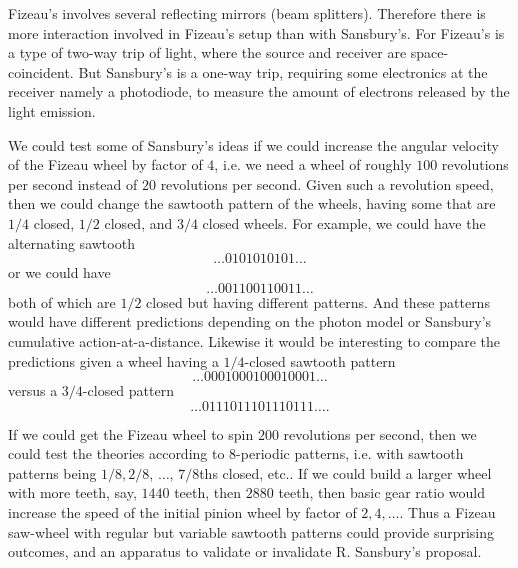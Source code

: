 \documentclass[12pt]{amsart}
\begin{document}
Fizeau's involves several reflecting mirrors (beam splitters). Therefore there is more interaction involved in Fizeau's setup than with Sansbury's. For Fizeau's is a type of two-way trip of light, where the source and receiver are space-coincident. But Sansbury's is a one-way trip, requiring some electronics at the receiver namely a photodiode, to measure the amount of electrons released by the light emission.

We could test some of Sansbury's ideas if we could increase the angular velocity of the Fizeau wheel by factor of $4$, i.e. we need a wheel of roughly $100$ revolutions per second instead of $20$ revolutions per second. Given such a revolution speed, then we could change the sawtooth pattern of the wheels, having some that are $1/4$ closed, $1/2$ closed, and $3/4$ closed wheels. For example, we could have the alternating sawtooth $$\ldots 0101010101 \ldots$$ or we could have $$\ldots 001100110011 \ldots$$ both of which are $1/2$ closed but having different patterns. And these patterns would have different predictions depending on the photon model or Sansbury's cumulative action-at-a-distance. Likewise it would be interesting to compare the predictions given a wheel having a $1/4$-closed sawtooth pattern $$\ldots 0001000100010001 \ldots$$ versus a $3/4$-closed pattern $$ \ldots 0111011101110111\ldots.$$ 

If we could get the Fizeau wheel to spin $200$ revolutions per second, then we could test the theories according to $8$-periodic patterns, i.e. with sawtooth patterns being $1/8, 2/8$, $\ldots$, $7/8$ths closed, etc.. If we could build a larger wheel with more teeth, say, $1440$ teeth, then $2880$ teeth, then basic gear ratio would increase the speed of the initial pinion wheel by factor of $2,4, \ldots$. Thus a Fizeau saw-wheel with regular but variable sawtooth patterns could provide surprising outcomes, and an apparatus to validate or invalidate R. Sansbury's proposal.






\end{document}
